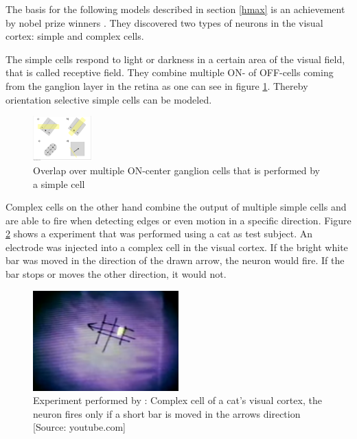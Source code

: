 		The basis for the following models described in section \ref{hmax} is an achievement by nobel prize winners \citeauthor{hubel1962receptive}. They discovered two types of neurons in the visual cortex: simple and complex cells.
		
		The simple cells respond to light or darkness in a certain area of the visual field, that is called receptive field. They combine multiple ON- of OFF-cells coming from the ganglion layer in the retina as one can see in figure \ref{simple-cell}. Thereby orientation selective simple cells can be modeled.

		\begin{figure}[H]
			\centering
			\captionsetup{justification=centering,margin=1cm}
			\includegraphics[width=0.2\textwidth, trim=6.9cm 2cm 21.4cm 17cm, clip]{images/Simple_and_Complex_Cells.pdf}
			\caption[https://en.wikipedia.org/wiki/File:Simple\_and\_Complex\_Cells.pdf]{Overlap over multiple ON-center ganglion cells that is performed by a simple cell}
			\label{simple-cell}
		\end{figure}
		
		Complex cells on the other hand combine the output of multiple simple cells and are able to fire when detecting edges or even motion in a specific direction. Figure \ref{hubel-exp} shows a experiment that was performed using a cat as test subject. An electrode was injected into a complex cell in the visual cortex. If the bright white bar was moved in the direction of the drawn arrow, the neuron would fire. If the bar stops or moves the other direction, it would not.
		
		\begin{figure}[H]
			\centering
			\captionsetup{justification=centering,margin=1cm}
			\includegraphics[width=0.5\textwidth]{images/hubel-experiment.png}
			\caption{Experiment performed by \citeauthor{hubel1962receptive}: Complex cell of a cat's visual cortex, the neuron fires only if a short bar is moved in the arrows direction [Source: youtube.com]}
			\label{hubel-exp}
		\end{figure}
		

